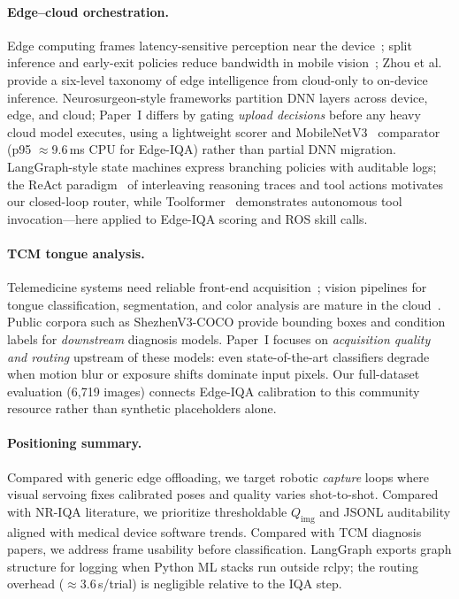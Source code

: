 \paragraph{Edge--cloud orchestration.}
Edge computing frames latency-sensitive perception near the device~\cite{wang2014edge}; split inference and early-exit policies reduce bandwidth in mobile vision~\cite{kang2017neurosurgeon,li2018edge}; Zhou et al.~\cite{zhou2019edge} provide a six-level taxonomy of edge intelligence from cloud-only to on-device inference.
Neurosurgeon-style frameworks partition DNN layers across device, edge, and cloud; Paper~I differs by gating \emph{upload decisions} before any heavy cloud model executes, using a lightweight scorer and MobileNetV3~\cite{howard2019mobilenetv3} comparator (p95 $\approx$9.6\,ms CPU for Edge-IQA) rather than partial DNN migration.
LangGraph-style state machines express branching policies with auditable logs; the ReAct paradigm~\cite{yao2023react} of interleaving reasoning traces and tool actions motivates our closed-loop router, while Toolformer~\cite{schick2023toolformer} demonstrates autonomous tool invocation---here applied to Edge-IQA scoring and ROS skill calls.

\paragraph{TCM tongue analysis.}
Telemedicine systems need reliable front-end acquisition~\cite{chen2021telemed}; vision pipelines for tongue classification, segmentation, and color analysis are mature in the cloud~\cite{zhang2020tongue,qi2016tongue,huang2015tcn}.
Public corpora such as ShezhenV3-COCO provide bounding boxes and condition labels for \emph{downstream} diagnosis models.
Paper~I focuses on \emph{acquisition quality and routing} upstream of these models: even state-of-the-art classifiers degrade when motion blur or exposure shifts dominate input pixels.
Our full-dataset evaluation (6{,}719 images) connects Edge-IQA calibration to this community resource rather than synthetic placeholders alone.

\paragraph{Positioning summary.}
Compared with generic edge offloading, we target robotic \emph{capture} loops where visual servoing fixes calibrated poses and quality varies shot-to-shot.
Compared with NR-IQA literature, we prioritize thresholdable $Q_{\mathrm{img}}$ and JSONL auditability aligned with medical device software trends.
Compared with TCM diagnosis papers, we address frame usability before classification.
LangGraph exports graph structure for logging when Python ML stacks run outside rclpy; the routing overhead ($\approx$3.6\,\textmu s/trial) is negligible relative to the IQA step.
